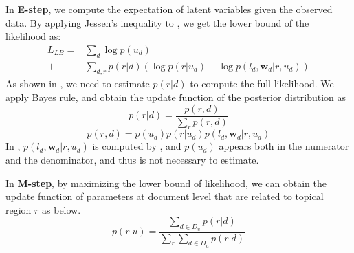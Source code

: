 In \textbf{E-step}, we compute the expectation
of latent variables given the observed data.
By applying Jessen's inequality to ,
we get the lower bound of the likelihood as:
\begin{equation}
\begin{split}
L_{LB}=&\sum_{d}{\log{p(u_d)}}\\
+&\sum_{d,r}{p(r|d)(\log{p(r|u_d)}+\log{p(l_d,\mathbf{w}_d|r,u_d)})}
\end{split}
\label{eq:loglikeli1}
\end{equation}
As shown in ,
we need to estimate $p(r|d)$ to compute the full likelihood.
We apply Bayes rule, and obtain the update
function of the posterior distribution as
\begin{equation}
p(r|d)=\frac{p(r,d)}{\sum_{r}{p(r,d)}}
\label{eq:prd}
\end{equation}
\begin{equation}
p(r,d)=p(u_d)p(r|u_d)p(l_d,\mathbf{w}_d|r,u_d)
\label{eq:prdjoint}
\end{equation}
In ,
$p(l_d,\mathbf{w}_d|r,u_d)$ is computed by , and
$p(u_d)$ appears both in the numerator and the denominator,
and thus is not necessary to estimate.

In \textbf{M-step}, by maximizing the lower bound of likelihood,
we can obtain the update function of parameters at document level
that are related to topical region $r$ as below.
\begin{equation}
p(r|u)=\frac{\sum_{d\in D_u}{p(r|d)}}{\sum_{r}{\sum_{d\in D_u}{p(r|d)}}}
\label{eq:pru}
\end{equation}

